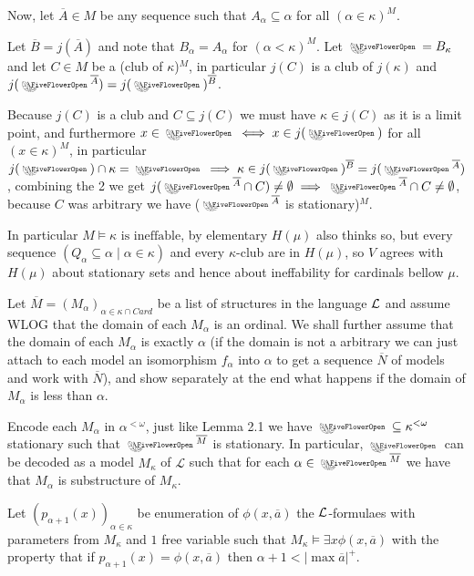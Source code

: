 \begin{cExercise}
\begin{cPart}
		Now, let $\overline A\in M$ be any sequence such that $A_\alpha\subseteq \alpha$ for all $(\alpha\in \kappa)^M$.
		
		Let $\overline B=j(\overline A)$ and note that $B_\alpha=A_\alpha$ for $(\alpha<\kappa)^M$. Let $\flower=B_\kappa$ and let $C\in M$ be a (club of $\kappa$)$^M$, in particular $j(C)$ is a club of $j(\kappa)$ and $j(\flower^{\overline A})=j(\flower)^{\overline B}$.
		
		Because $j(C)$ is a club and $C\subseteq j(C)$ we must have $\kappa\in j(C)$ as it is a limit point, and furthermore $x\in\flower\iff x\in j(\flower)$ for all $(x\in \kappa)^M$, in particular $j(\flower)\cap\kappa=\flower\implies\kappa\in j(\flower)^{\overline B}=j(\flower^{\overline A})$, combining the 2 we get $j(\flower^{\overline A}\cap C)\ne\emptyset\implies \flower^{\overline A}\cap C\ne\emptyset$, because $C$ was arbitrary we have ($\flower^{\overline A}$ is stationary)$^M$.
		
		In particular $M\models \kappa\text{ is ineffable}$, by elementary $H(\mu)$ also thinks so, but every sequence $(Q_\alpha\subseteq\alpha\mid\alpha\in\kappa)$ and every $\kappa$-club are in $H(\mu)$, so $V$ agrees with $H(\mu)$ about stationary sets and hence about ineffability for cardinals bellow $\mu$. 
	\end{cPart}
	\begin{cPart}
		Let $\overline M=(M_\alpha)_{\alpha\in\kappa\cap Card}$ be a list of structures in the language $\cal{L}$ and assume WLOG that the domain of each $M_\alpha$ is an ordinal. We shall further assume that the domain of each $M_\alpha$ is exactly $\alpha$ (if the domain is not a arbitrary we can just attach to each model an isomorphism $f_\alpha$ into $\alpha$ to get a sequence $\overline N$ of models and work with $\overline N$), and show separately at the end what happens if the domain of $M_\alpha$ is less than $\alpha$.
		
		Encode each $M_\alpha$ in $\alpha^{<\omega}$, just like Lemma 2.1 we have $\flower\subseteq \kappa^{<\omega}$ stationary such that $\flower^{\overline M}$ is stationary. In particular, $\flower$ can be decoded as a model $M_\kappa$ of $\mathcal L$ such that for each $\alpha\in\flower^{\overline{M}}$ we have that $M_\alpha$ is substructure of $M_\kappa$.
		
		Let $(p_{\alpha+1}(x))_{\alpha\in\kappa}$ be enumeration of $\phi(x,\overline a)$ the $\cal{L}$-formulaes with parameters from $M_\kappa$ and $1$ free variable such that $M_\kappa\models\exists x \phi(x,\overline a)$ with the property that if $p_{\alpha+1}(x)=\phi(x,\overline a)$ then $\alpha+1<|\max \overline a|^+$.
		

\end{cPart}
\end{cExercise}
